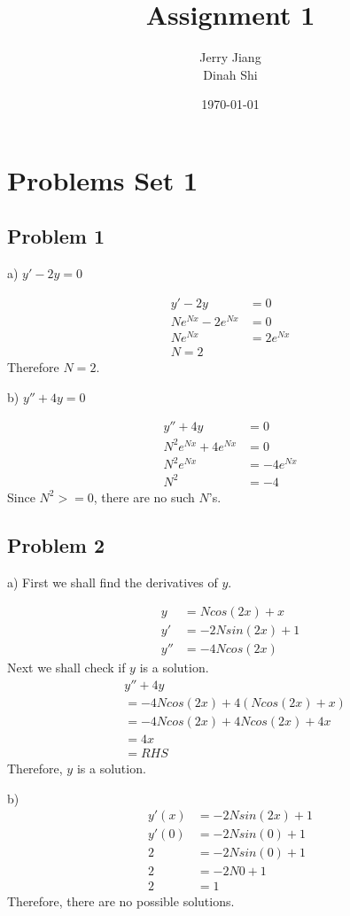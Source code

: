 \documentclass[titlepage]{article}
\title{Assignment 1}
\date{\today}
\author{Jerry Jiang\\ Dinah Shi}
\begin{document}
\maketitle

\noindent
\section{Problems Set 1}
\subsection{Problem 1}
a) $y' - 2y = 0$

\begin{align*}
  y' - 2y &= 0
  \\ Ne^{Nx} - 2e^{Nx} &= 0
  \\ Ne^{Nx} &= 2e^{Nx}
  \\ N = 2
\end{align*}
Therefore $N = 2$.

\vspace{1em}
\noindent
b) $y'' + 4y = 0$

\begin{align*}
  y'' + 4y &= 0
  \\ N^2e^{Nx} + 4e^{Nx} &= 0
  \\ N^2e^{Nx} &= -4e^{Nx}
  \\ N^2 &= -4
\end{align*}
Since $N^2 >= 0$, there are no such $N$'s.

\subsection{Problem 2}

a) First we shall find the derivatives of $y$.

\begin{align*}
  y &= Ncos(2x) + x
  \\ y' &= -2Nsin(2x) + 1
  \\ y'' &= -4Ncos(2x)
\end{align*}
Next we shall check if $y$ is a solution.
\begin{align*}
  &y'' + 4y
  \\ &= -4Ncos(2x) + 4(Ncos(2x) + x)
  \\ &= -4Ncos(2x) + 4Ncos(2x) + 4x
  \\ &= 4x
  \\ &= RHS
\end{align*}
Therefore, $y$ is a solution.

\vspace{1em}
\noindent
b)
\begin{align*}
  y'(x) &= -2Nsin(2x) + 1
  \\ y'(0) &= -2Nsin(0) + 1
  \\ 2 &= -2Nsin(0) + 1
  \\ 2 &= -2N0 + 1
  \\ 2 &= 1
\end{align*}
Therefore, there are no possible solutions.
\end{document}
